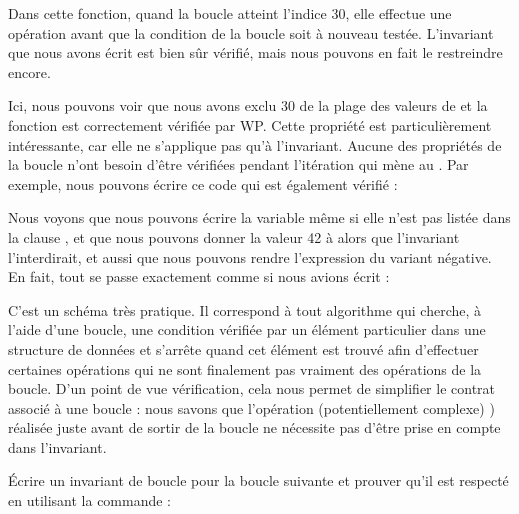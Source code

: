 

Dans cette fonction, quand la boucle atteint l'indice 30, elle effectue une opération
 avant que la condition de la boucle soit à nouveau testée.
L'invariant que nous avons écrit est bien sûr vérifié, mais nous pouvons en fait le
restreindre encore.






Ici, nous pouvons voir que nous avons exclu 30 de la plage des valeurs de
 et la fonction est correctement vérifiée par WP. Cette propriété
est particulièrement intéressante, car elle ne s'applique pas qu'à l'invariant.
Aucune des propriétés de la boucle n'ont besoin d'être vérifiées pendant l'itération
qui mène au . Par exemple, nous pouvons écrire ce code qui est
également vérifié :





Nous voyons que nous pouvons écrire la variable  même si elle
n'est pas listée dans la clause , et que nous pouvons
donner la valeur 42 à  alors que l'invariant l'interdirait, et aussi
que nous pouvons rendre l'expression du variant négative. En fait, tout se passe
exactement comme si nous avions écrit :





C'est un schéma très pratique. Il correspond à tout algorithme qui cherche, à l'aide
d'une boucle, une condition vérifiée par un élément particulier dans une structure
de données et s'arrête quand cet élément est trouvé afin d'effectuer certaines
opérations qui ne sont finalement pas vraiment des opérations de la boucle. D'un
point de vue vérification, cela nous permet de simplifier le contrat associé à
une boucle : nous savons que l'opération (potentiellement complexe) ) réalisée
juste avant de sortir de la boucle ne nécessite pas d'être prise en compte dans
l'invariant.






Écrire un invariant de boucle pour la boucle suivante et prouver qu'il est respecté
en utilisant la commande :


